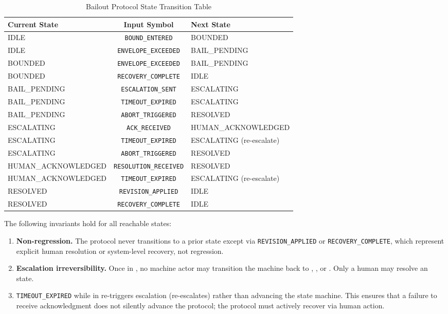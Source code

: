 \begin{table}[h]
\centering
\caption{Bailout Protocol State Transition Table}
\label{tab:transition}
\begin{tabular}{lcl}
\toprule
Current State & Input Symbol & Next State \\
\midrule
IDLE & \texttt{BOUND\_ENTERED} & BOUNDED \\
IDLE & \texttt{ENVELOPE\_EXCEEDED} & BAIL\_PENDING \\
BOUNDED & \texttt{ENVELOPE\_EXCEEDED} & BAIL\_PENDING \\
BOUNDED & \texttt{RECOVERY\_COMPLETE} & IDLE \\
BAIL\_PENDING & \texttt{ESCALATION\_SENT} & ESCALATING \\
BAIL\_PENDING & \texttt{TIMEOUT\_EXPIRED} & ESCALATING \\
BAIL\_PENDING & \texttt{ABORT\_TRIGGERED} & RESOLVED \\
ESCALATING & \texttt{ACK\_RECEIVED} & HUMAN\_ACKNOWLEDGED \\
ESCALATING & \texttt{TIMEOUT\_EXPIRED} & ESCALATING (re-escalate) \\
ESCALATING & \texttt{ABORT\_TRIGGERED} & RESOLVED \\
HUMAN\_ACKNOWLEDGED & \texttt{RESOLUTION\_RECEIVED} & RESOLVED \\
HUMAN\_ACKNOWLEDGED & \texttt{TIMEOUT\_EXPIRED} & ESCALATING (re-escalate) \\
RESOLVED & \texttt{REVISION\_APPLIED} & IDLE \\
RESOLVED & \texttt{RECOVERY\_COMPLETE} & IDLE \\
\bottomrule
\end{tabular}
\end{table}

The following invariants hold for all reachable states:

\begin{enumerate}
\item \textbf{Non-regression.} The protocol never transitions to a prior state except via \texttt{REVISION\_APPLIED} or \texttt{RECOVERY\_COMPLETE}, which represent explicit human resolution or system-level recovery, not regression.
\item \textbf{Escalation irreversibility.} Once in , no machine actor may transition the machine back to , , or . Only a human may resolve an  state.
\item \texttt{TIMEOUT\_EXPIRED} while in  re-triggers escalation (re-escalates) rather than advancing the state machine. This ensures that a failure to receive acknowledgment does not silently advance the protocol; the protocol must actively recover via human action.
\end{enumerate}

